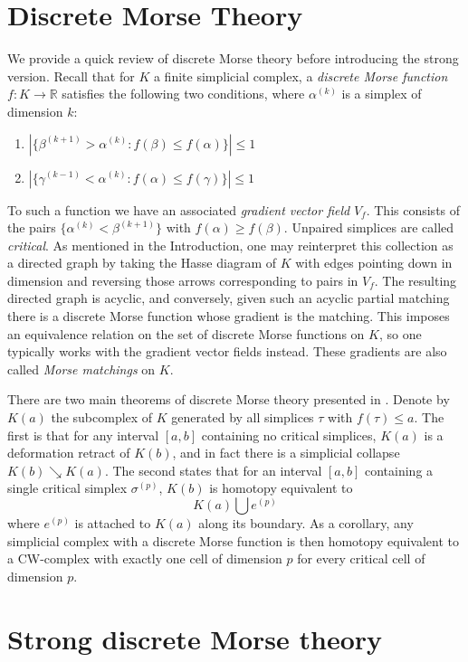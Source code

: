 \documentclass{amsart}
\theoremstyle{definition}
\begin{document}
\section{Discrete Morse Theory}

We provide a quick review of discrete Morse theory before introducing the strong version. Recall that for $K$ a finite simplicial complex, a \textit{discrete Morse function} $f:K\to\mathbb{R}$ satisfies the following two conditions, where $\alpha^{(k)}$ is a simplex of dimension $k$:
\begin{enumerate}
\item $|\{\beta^{(k+1)}>\alpha^{(k)}:f(\beta)\leq f(\alpha)\}|\leq 1$
\item $|\{\gamma^{(k-1)}<\alpha^{(k)}:f(\alpha)\leq f(\gamma)\}|\leq 1$
\end{enumerate}
To such a function we have an associated \textit{gradient vector field} $V_f$. This consists of the pairs $\{\alpha^{(k)}<\beta^{(k+1)}\}$ with $f(\alpha)\ge f(\beta)$. Unpaired simplices are called \textit{critical}. As mentioned in the Introduction, one may reinterpret this collection as a directed graph by taking the Hasse diagram of $K$ with edges pointing down in dimension and reversing those arrows corresponding to pairs in $V_f$. The resulting directed graph is acyclic, and conversely, given such an acyclic partial matching there is a discrete Morse function whose gradient is the matching. This imposes an equivalence relation on the set of discrete Morse functions on $K$, so one typically works with the gradient vector fields instead. These gradients are also called {\em Morse matchings} on $K$.
 

There are two main theorems of discrete Morse theory presented in \cite{Forman1998}. Denote by $K(a)$ the subcomplex of $K$ generated by all simplices $\tau$ with $f(\tau)\leq a$. The first is that for any interval $[a,b]$ containing no critical simplices, $K(a)$ is a deformation retract of $K(b)$, and in fact there is a simplicial collapse $K(b)\searrow K(a)$. The second states that for an interval $[a,b]$ containing a single critical simplex $\sigma^{(p)}$, $K(b)$ is homotopy equivalent to $$K(a)\bigcup e^{(p)}$$ where $e^{(p)}$ is attached to $K(a)$ along its boundary. As a corollary, any simplicial complex with a discrete Morse function is then homotopy equivalent to a CW-complex with exactly one cell of dimension $p$ for every critical cell of dimension $p$.

\section{Strong discrete Morse theory}\label{sec:strong}
\end{document}
